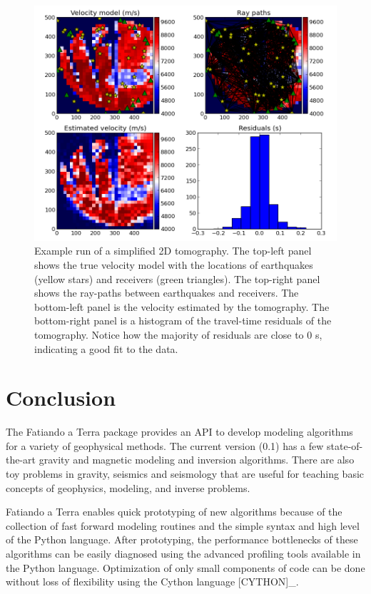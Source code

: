 \begin{figure}
    \centering
    \includegraphics[width=\textwidth]{figures/paper1/seismic_tomo}
    \caption{
        Example run of a simplified 2D tomography. The top-left panel shows the
        true velocity model with the locations of earthquakes (yellow stars)
        and receivers (green triangles). The top-right panel shows the
        ray-paths between earthquakes and receivers. The bottom-left panel is
        the velocity estimated by the tomography. The bottom-right panel is a
        histogram of the travel-time residuals of the tomography. Notice how
        the majority of residuals are close to 0 s, indicating a good fit to
        the data.
    }
    \label{fig:tomo}
\end{figure}




\section{Conclusion}

The Fatiando a Terra package provides an API to develop modeling
algorithms for a variety of geophysical methods. The current version
(0.1) has a few state-of-the-art gravity and magnetic modeling and
inversion algorithms. There are also toy problems in gravity, seismics
and seismology that are useful for teaching basic concepts of
geophysics, modeling, and inverse problems.

Fatiando a Terra enables quick prototyping of new algorithms because of
the collection of fast forward modeling routines and the simple syntax
and high level of the Python language. After prototyping, the
performance bottlenecks of these algorithms can be easily diagnosed
using the advanced profiling tools available in the Python language.
Optimization of only small components of code can be done without loss
of flexibility using the Cython language {[}CYTHON{]}\_.

